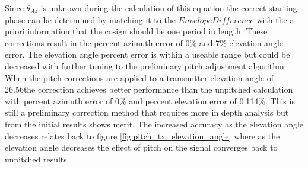 Since $\theta_{Az}$ is unknown during the calculation of this equation the correct starting phase can be determined by matching it to the $EnvelopeDifference$ with the a priori information that the cosign should be one period in length. These corrections result in the percent azimuth error of 0\% and 7\% elevation angle error. The elevation angle percent error is within a useable range but could be decreased with further tuning to the preliminary pitch adjustment algorithm. When the pitch corrections are applied to a transmitter elevation angle of 26.56\textdegree \space the correction achieves better performance than the unpitched calculation with percent azimuth error of 0\% and percent elevation error of 0.114\%. This is still a preliminary correction method that requires more in depth analysis but from the initial results shows merit. The increased accuracy as the elevation angle decreases relates back to figure \ref{fig:pitch_tx_elevation_angle} where as the elevation angle decreases the effect of pitch on the signal converges back to unpitched results.



